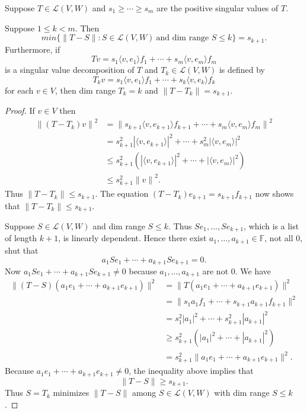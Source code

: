 \documentclass{scrartcl}
\begin{document}
\begin{definition}
  Suppose $T \in \mathcal{L}(V,W)$ and $s_1 \geq \cdots \geq s_m$ are the positive singular values of $T$.

  Suppose $1 \le k < m$. Then
  \[
    min\{ \| T-S\| :S \in \mathcal{L}(V,W)\ \text{and dim range } S \le k\} = s_{k+1}.
  \]
  Furthermore, if
  \[
    Tv = s_1\langle v,e_1\rangle f_1 + \cdots + s_m\langle v,e_m\rangle f_m
  \]
  is a singular value decomposition of $T$ and $T_k \in \mathcal{L}(V,W)$ is defined by
  \[
    T_k v = s_1\langle v,e_1\rangle f_1 + \cdots + s_k\langle v,e_k\rangle f_k
  \]
  for each $v\in V$, then dim range $T_k = k$ and $\| T-T_k\| = s_{k+1}$.
\end{definition}
\begin{proof}
  If $v \in V$ then
\begin{align*}
{\|(T-T_k)v\|}^2 &= {\|s_{k+1}\langle v,e_{k+1}\rangle f_{k+1}+\cdots +s_m\langle v,e_m\rangle f_m \|}^2 \\
               &= s_{k+1}^2{|\langle v,e_{k+1}\rangle |}^2 +\cdots +s_m^2{|\langle v,e_m\rangle |}^2 \\
               &\le s_{k+1}^2\left( {|\langle v,e_{k+1}\rangle |}^2+\cdots + {|\langle v,e_m\rangle |}^2\right) \\
               &\le s_{k+1}^2{\|v\|}^2.
\end{align*}
Thus $\|T-T_k\| \le s_{k+1}$. The equation $(T-T_k)e_{k+1} = s_{k+1}f_{k+1}$ now shows that $\|T-T_k\| \le s_{k+1}$.

  Suppose $S \in \mathcal{L}(V,W)$ and dim range $S \le k$. Thus $Se_1,\ldots ,Se_{k+1}$, which is a list of length $k + 1$, is linearly dependent. Hence there exist $a_1,\ldots ,a_{k+1} \in \mathbb{F}$, not all 0, shut that
\[
  a_1Se_1 + \cdots + a_{k+1}Se_{k+1} = 0.
\]
Now $a_1Se_1 + \cdots + a_{k+1}Se_{k+1} \ne 0$ because $a_1,\ldots ,a_{k+1}$ are not 0. We have
\begin{align*}
\|(T - S)(a_1 e_1 + \cdots + a_{k+1} e_{k+1})\|^2 
  &= \|T(a_1 e_1 + \cdots + a_{k+1} e_{k+1})\|^2 \\
  &= \|s_1 a_1 f_1 + \cdots + s_{k+1} a_{k+1} f_{k+1}\|^2 \\
  &= s_1^2 |a_1|^2 + \cdots + s_{k+1}^2 |a_{k+1}|^2 \\
  &\ge s_{k+1}^2 (|a_1|^2 + \cdots + |a_{k+1}|^2) \\
  &= s_{k+1}^2 \|a_1 e_1 + \cdots + a_{k+1} e_{k+1}\|^2.
\end{align*}
Because $a_1e_1 + \cdots + a_{k+1}e_{k+1} \ne 0$, the inequality above implies that
\[
  \|T-S\| \ge s_{k+1}.
\]
Thus $S = T_k$ minimizes $\|T-S\|$ among $S \in \mathcal{L}(V,W)$ with dim range $S \le k$.
\end{proof}
\end{document}
